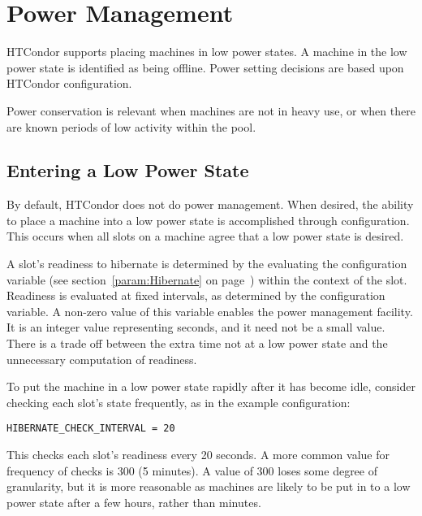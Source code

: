 \section{\label{sec:power-man}Power Management}

HTCondor supports placing machines in low power states.
A machine in the low power state is identified as being offline.
Power setting decisions are based upon  
HTCondor configuration.

Power conservation is relevant when machines are not in heavy use,
or when there are known periods of low activity within the pool.

\subsection{Entering a Low Power State}

By default, HTCondor does not do power management.
When desired, the ability to place a machine into a low
power state is accomplished through configuration.
This occurs when all slots on a machine agree that a low power state
is desired.

A slot's readiness to hibernate is determined by the 
evaluating the  configuration variable
(see section~\ref{param:Hibernate} on page~\pageref{param:Hibernate})
within the context of the slot.
Readiness is evaluated at fixed intervals, 
as determined by the  configuration variable.
A non-zero value of this variable enables the power management facility.
It is an integer value representing seconds,
and it need not be a small value.
There is a trade off between the extra time not at a low power state
and the unnecessary computation of readiness.  

To put the machine in a low power state rapidly
after it has become idle, consider checking each slot's state frequently,
as in the example configuration:

\begin{verbatim}
HIBERNATE_CHECK_INTERVAL = 20
\end{verbatim}

This checks each slot's readiness every 20 seconds.
A more common value for frequency of checks is 300 (5 minutes).
A value of 300 loses some degree of granularity,
but it is more reasonable as machines are likely to be put 
in to a low power state after a few hours, rather than minutes.
 
